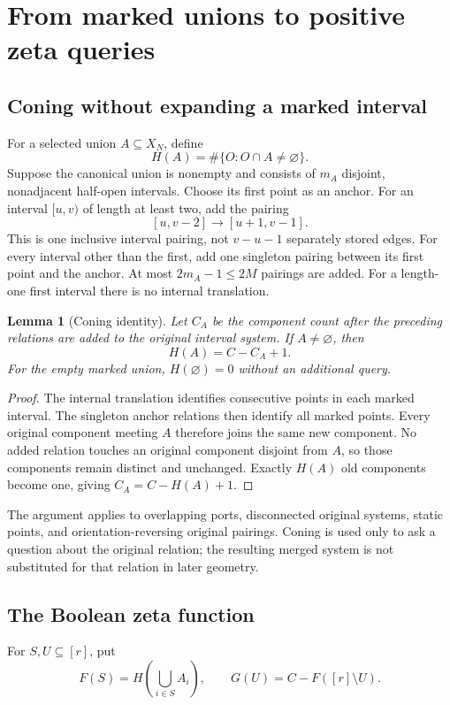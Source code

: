 \documentclass[11pt,letterpaper]{article}
\newtheorem{lemma}[theorem]{Lemma}
\begin{document}
\section{From marked unions to positive zeta queries}
\label{sec:oracle}

\subsection{Coning without expanding a marked interval}
For a selected union $A\subseteq X_N$, define
\[
 H(A)=\#\{O:O\cap A\neq\varnothing\}.
\]
Suppose the canonical union is nonempty and consists of $m_A$ disjoint,
nonadjacent half-open intervals. Choose its first point as an anchor. For an
interval $[u,v)$ of length at least two, add the pairing
\[
 [u,v-2]\longrightarrow[u+1,v-1].
\]
This is one inclusive interval pairing, not $v-u-1$ separately stored edges.
For every interval other than the first, add one singleton pairing between
its first point and the anchor. At most $2m_A-1\leq 2M$ pairings are added.
For a length-one first interval there is no internal translation.

\begin{lemma}[Coning identity]
\label{lem:cone}
Let $C_A$ be the component count after the preceding relations are added to
the original interval system. If $A\neq\varnothing$, then
\[
 H(A)=C-C_A+1.
\]
For the empty marked union, $H(\varnothing)=0$ without an additional query.
\end{lemma}
\begin{proof}
The internal translation identifies consecutive points in each marked
interval. The singleton anchor relations then identify all marked points.
Every original component meeting $A$ therefore joins the same new component.
No added relation touches an original component disjoint from $A$, so those
components remain distinct and unchanged. Exactly $H(A)$ old components
become one, giving $C_A=C-H(A)+1$.
\end{proof}

The argument applies to overlapping ports, disconnected original systems,
static points, and orientation-reversing original pairings. Coning is used
only to ask a question about the original relation; the resulting merged
system is not substituted for that relation in later geometry.

\subsection{The Boolean zeta function}
For $S,U\subseteq[r]$, put
\[
 F(S)=H\!\left(\bigcup_{i\in S}A_i\right),\qquad
 G(U)=C-F([r]\setminus U).
\]
\end{document}
